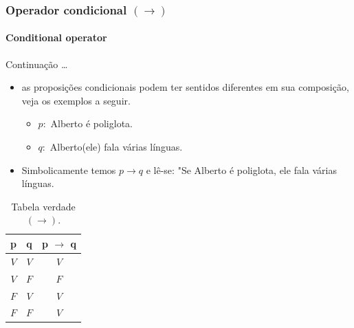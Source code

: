 \documentclass[10pt, headsepline, captions=tableabove, xcolor=table]{beamer}
\begin{document}
\begin{frame}[t]
    \frametitle{Operador condicional $(\rightarrow)$ }
    \framesubtitle{Conditional operator}
    \begin{block}{Continuação \dots}
        \begin{itemize}
            \item as proposições condicionais podem ter sentidos diferentes em sua composição, veja os exemplos a seguir.
            \begin{itemize}
                \item[] $p:$ Alberto é poliglota.
                \item[] $q:$ Alberto(ele) fala várias línguas.
            \end{itemize}
            \item Simbolicamente temos $p \rightarrow q$ e lê-se: "Se Alberto é poliglota, ele fala várias línguas.
        \end{itemize}
    \end{block}
    \vspace{-5mm}
    \begin{table}[ht]
        \caption{Tabela verdade $(\rightarrow)$.}
        \label{tab:tabela-condicao}
        \begin{tabular}{|c|c|c|}
        \hline
        \rowcolor[HTML]{EFEFEF} 
        \textbf{p} & \textbf{q} & \textbf{p $\rightarrow$ q} \\ \hline
        $V$        & $V$        & $V$                        \\ \hline
        $V$        & $F$        & $F$                        \\ \hline
        $F$        & $V$        & $V$                        \\ \hline
        $F$        & $F$        & $V$                        \\ \hline
        \end{tabular}
    \end{table}
\end{frame}
%
\end{document}
